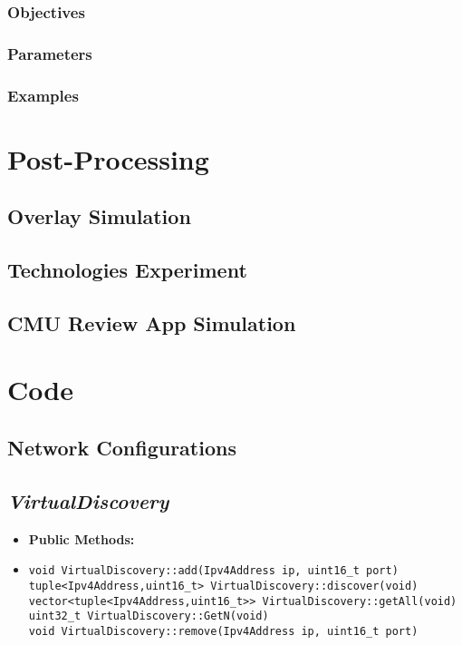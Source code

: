 \documentclass[a4paper]{book}
\begin{document}
\subsection{Objectives}


\subsection{Parameters}

\subsection{Examples}

\chapter{Post-Processing}

\section{Overlay Simulation}

\section{Technologies Experiment}

\section{CMU Review App Simulation}

\chapter{Code}

\section{Network Configurations}


\section{\textit{VirtualDiscovery}}

\begin{itemize}
\item[] \textbf{Public Methods:}
\item[]\begin{verbatim}
void VirtualDiscovery::add(Ipv4Address ip, uint16_t port)
tuple<Ipv4Address,uint16_t> VirtualDiscovery::discover(void)
vector<tuple<Ipv4Address,uint16_t>> VirtualDiscovery::getAll(void)
uint32_t VirtualDiscovery::GetN(void)
void VirtualDiscovery::remove(Ipv4Address ip, uint16_t port)
\end{verbatim}
\end{itemize}
\end{document}
